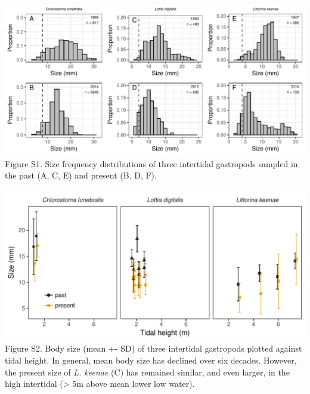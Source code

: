 \documentclass[11pt,]{article}
\begin{document}
\newpage

\includegraphics[width=1.00000\textwidth]{../../figs_ms/plot_size_frequency.pdf}
Figure S1. Size frequency distributions of three intertidal gastropods
sampled in the past (A, C, E) and present (B, D, F).

\newpage

\includegraphics{../../figs_ms/plot_size_era_tide_means.pdf} Figure S2.
Body size (mean +- SD) of three intertidal gastropods plotted against
tidal height. In general, mean body size has declined over six decades.
However, the present size of \emph{L. keenae} (C) has remained similar,
and even larger, in the high intertidal (\textgreater{} 5m above mean
lower low water).

\newpage
\end{document}
